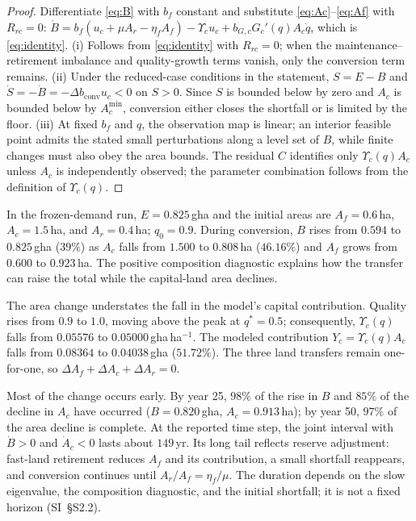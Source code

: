 \documentclass[preprint,12pt,authoryear]{elsarticle}
\newcommand{\dconv}{\Delta b_{\mathrm{conv}}}
\newcommand{\Ups}{\Upsilon_c}
\newcommand{\Acmin}{A_c^{\min}}
\begin{document}
\begin{proof}
Differentiate \eqref{eq:B} with $b_f$ constant and substitute \eqref{eq:Ac}--\eqref{eq:Af} with $R_{rc}=0$: $\dot B=b_f(u_c+\mu A_r-\eta_fA_f)-\Ups u_c+b_{G,c}G_c'(q)A_c\dot q$, which is \eqref{eq:identity}. (i) Follows from \eqref{eq:identity} with $R_{rc}=0$; when the maintenance--retirement imbalance and quality-growth terms vanish, only the conversion term remains. (ii) Under the reduced-case conditions in the statement, $S=E-B$ and $\dot S=-\dot B=-\dconv u_c<0$ on $S>0$. Since $S$ is bounded below by zero and $A_c$ is bounded below by $\Acmin$, conversion either closes the shortfall or is limited by the floor. (iii) At fixed $b_f$ and $q$, the observation map is linear; an interior feasible point admits the stated small perturbations along a level set of $B$, while finite changes must also obey the area bounds. The residual $C$ identifies only $\Ups(q)A_c$ unless $A_c$ is independently observed; the parameter combination follows from the definition of $\Ups(q)$.
\end{proof}

In the frozen-demand run, $E=0.825$\,gha and the initial areas are $A_f=0.6$\,ha, $A_c=1.5$\,ha, and $A_r=0.4$\,ha; $q_0=0.9$. During conversion, $B$ rises from $0.594$ to $0.825$\,gha ($39\%$) as $A_c$ falls from $1.500$ to $0.808$\,ha ($46.16\%$) and $A_f$ grows from $0.600$ to $0.923$\,ha. The positive composition diagnostic explains how the transfer can raise the total while the capital-land area declines.

The area change understates the fall in the model's capital contribution. Quality rises from $0.9$ to $1.0$, moving above the peak at $q^*=0.5$; consequently, $\Ups(q)$ falls from $0.05576$ to $0.05000$\,gha\,ha$^{-1}$. The modeled contribution $Y_c=\Ups(q)A_c$ falls from $0.08364$ to $0.04038$\,gha ($51.72\%$). The three land transfers remain one-for-one, so $\Delta A_f+\Delta A_c+\Delta A_r=0$.

Most of the change occurs early. By year 25, $98\%$ of the rise in $B$ and $85\%$ of the decline in $A_c$ have occurred ($B=0.820$\,gha, $A_c=0.913$\,ha); by year 50, $97\%$ of the area decline is complete. At the reported time step, the joint interval with $\dot B>0$ and $\dot A_c<0$ lasts about $149$\,yr. Its long tail reflects reserve adjustment: fast-land retirement reduces $A_f$ and its contribution, a small shortfall reappears, and conversion continues until $A_r/A_f=\eta_f/\mu$. The duration depends on the slow eigenvalue, the composition diagnostic, and the initial shortfall; it is not a fixed horizon (SI~\S S2.2).
\end{document}

